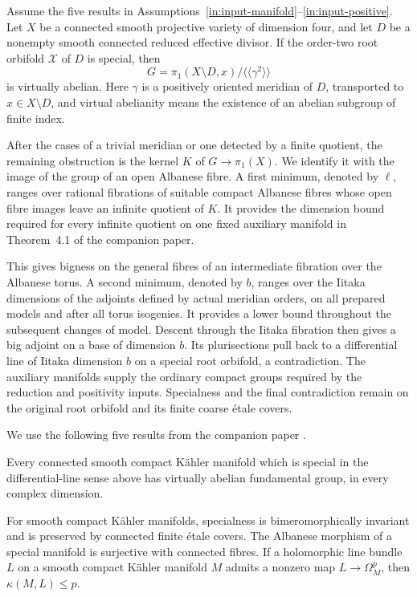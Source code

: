\begin{theorem}\label{in:main}
Assume the five results in
Assumptions~\ref{in:input-manifold}--\ref{in:input-positive}.
Let $X$ be a connected
smooth projective variety of dimension four, and let $D$ be a nonempty
smooth connected reduced effective divisor.  If the order-two root
orbifold $\mathcal X$ of $D$ is special, then
\[
 G=\pi_1(X\setminus D,x)\big/\langle\!\langle\gamma^2\rangle\!\rangle
\]
is virtually abelian.  Here $\gamma$ is a positively oriented meridian
of $D$, transported to $x\in X\setminus D$, and virtual abelianity
means the existence of an abelian subgroup of finite index.
\end{theorem}

After the cases of a trivial meridian or one detected by a finite
quotient, the remaining obstruction is the kernel $K$ of
$G\to\pi_1(X)$. We identify it with the image of
the group of an open Albanese fibre. A first minimum, denoted by
$\ell$, ranges over rational fibrations of suitable compact Albanese
fibres whose open fibre images leave an infinite quotient of $K$.
It provides the dimension bound required for every infinite quotient
on one fixed auxiliary manifold in Theorem~4.1 of the companion paper.

This gives bigness on the general fibres of an intermediate fibration
over the Albanese torus. A second minimum, denoted by $b$, ranges over
the Iitaka dimensions of the adjoints defined by actual meridian
orders, on all prepared models and after all torus isogenies.
It provides a lower bound throughout the subsequent changes of model.
Descent through the Iitaka fibration then gives a big adjoint on a
base of dimension $b$. Its plurisections pull back to a differential
line of Iitaka dimension $b$ on a special root orbifold, a contradiction.
The auxiliary manifolds supply the ordinary compact groups required
by the reduction and positivity inputs. Specialness and the final
contradiction remain on the original root orbifold and its finite
coarse \'etale covers.

We use the following five results from the companion paper \cite{Supplied}.

\begin{assumption}\label{in:input-manifold}
Every connected smooth compact K\"ahler manifold which is special in
the differential-line sense above has virtually abelian fundamental
group, in every complex dimension.
\end{assumption}

\begin{assumption}\label{in:input-special}
For smooth compact K\"ahler manifolds, specialness is bimeromorphically
invariant and is preserved by connected finite \'etale covers.  The
Albanese morphism of a special manifold is surjective with connected
fibres.  If a holomorphic line bundle $L$ on a smooth compact K\"ahler
manifold $M$ admits a nonzero map $L\to\Omega_M^p$, then
$\kappa(M,L)\le p$.
\end{assumption}

